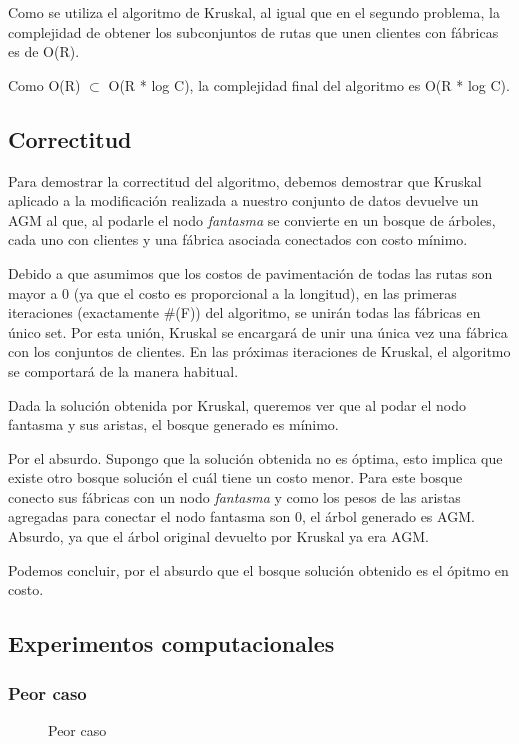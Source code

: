 \documentclass[a4paper, 10pt, twoside]{article}
\newcommand{\tresgraficos}[3]{
    \newcommand{\separacion}{-2.2em}
    \vspace{\separacion}
    
    \vspace{\separacion}
    
    \vspace{\separacion}
    
}
\begin{document}
Como se utiliza el algoritmo de Kruskal, al igual que en el segundo problema, la complejidad de obtener los subconjuntos de rutas que unen clientes con fábricas es de O(R).

Como O(R) $\subset$ O(R * log C), la complejidad final del algoritmo es O(R * log C).
\subsection{Correctitud}
Para demostrar la correctitud del algoritmo, debemos demostrar que Kruskal aplicado a la modificación realizada a nuestro conjunto de datos devuelve un AGM al que, al podarle el nodo \textit{fantasma} se convierte en un bosque de árboles, cada uno con clientes y una fábrica asociada conectados con costo mínimo.

Debido a que asumimos que los costos de pavimentación de todas las rutas son mayor a 0 (ya que el costo es proporcional a la longitud), en las primeras iteraciones (exactamente \#(F)) del algoritmo, se unirán todas las fábricas en único set. Por esta unión, Kruskal se encargará de unir una única vez una fábrica con los conjuntos de clientes. En las próximas iteraciones de Kruskal, el algoritmo se comportará  de la manera habitual.

Dada la solución obtenida por Kruskal, queremos ver que al podar el nodo fantasma y sus aristas, el bosque generado es mínimo.

Por el absurdo. Supongo que la solución obtenida no es óptima, esto implica que existe otro bosque solución el cuál tiene un costo menor. Para este bosque conecto sus fábricas con un nodo \textit{fantasma} y como los pesos de las aristas agregadas para conectar el nodo fantasma son 0, el árbol generado es AGM. Absurdo, ya que el árbol original devuelto por Kruskal ya era AGM.

Podemos concluir, por el absurdo que el bosque solución obtenido es el ópitmo en costo.


\subsection{Experimentos computacionales}


\newpage


\subsubsection{Peor caso}

\begin{figure}[H]
  \centering
  \tresgraficos{problema3-peor-caso}
               {problema3-peor-caso-logn}
               {problema3-peor-caso-n}
  \caption{Peor caso}
\end{figure}
\end{document}
